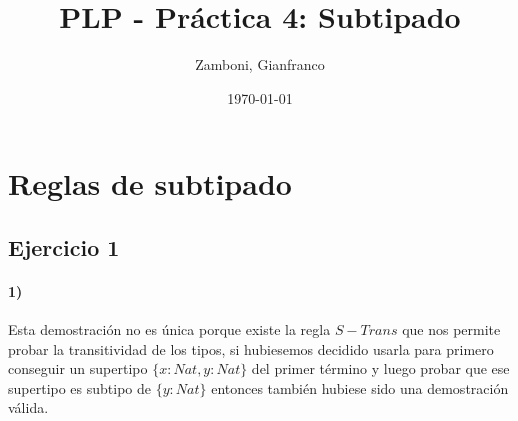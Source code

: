 \documentclass[10pt,a4paper, landscape]{article}
\begin{document}
	\title{PLP - Práctica 4: Subtipado}
	
	\date{\today}
	
	\author{Zamboni, Gianfranco}
	
	\maketitle
	\setcounter{page}{1}
	
	\section*{\centering Reglas de subtipado}
	\subsection{Ejercicio 1}
	\paragraph{1)}
	\begin{multicols}{2}
		\begin{center}
			\begin{scprooftree}
				\def\extraVskip{5pt}
				
				
				
			\end{scprooftree}
		\end{center}
		\vfill\null
		\columnbreak
		Esta demostración no es única porque existe la regla $S-Trans$ que nos permite probar la transitividad de los tipos, si hubiesemos decidido usarla para primero conseguir un supertipo $\{x:Nat,y:Nat\}$ del primer término y luego probar que ese supertipo es subtipo de $\{y:Nat\}$ entonces también hubiese sido una demostración válida.
		
	\end{multicols}
	
	\vspace*{1cm}
	\setlength{\columnsep}{-1cm}
\end{document}
